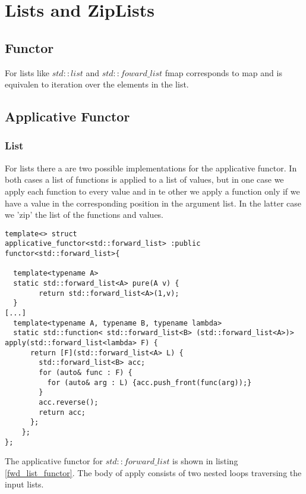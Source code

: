 \documentclass[12pt,fleqn]{article}
\begin{document}
\section{Lists and ZipLists}
%
%
\subsection{Functor}

For lists like $std::list$ and $std::foward\_list$ fmap corresponds to map and is equivalen to iteration over the elements in the list.

  
%
%
\subsection{Applicative Functor}
%
%

\subsubsection{List}
%
For lists there a are two possible implementations for the applicative functor.
In both cases a list of functions is applied to a list of values, but in one case we apply each function to every value and in te other we apply a function 
only if we have a value in the corresponding position in the argument list. 
In the latter case we 'zip' the list of the functions and values.
\begin{lstlisting}[caption=std::forward\_list is an applicative functor, label=fwd_list_functor]
template<> struct 
applicative_functor<std::forward_list> :public functor<std::forward_list>{

  template<typename A>
  static std::forward_list<A> pure(A v) {
		return std::forward_list<A>(1,v);
  }
[...]
  template<typename A, typename B, typename lambda>
  static std::function< std::forward_list<B> (std::forward_list<A>)> apply(std::forward_list<lambda> F) {
      return [F](std::forward_list<A> L) {
	    std::forward_list<B> acc;
	    for (auto& func : F) {
	      for (auto& arg : L) {acc.push_front(func(arg));}
        } 
	    acc.reverse();
	    return acc;
      };
    };
};
\end{lstlisting}
The applicative functor for $std::forward\_list$ is shown in listing \ref{fwd_list_functor}.
The body of apply consists of two nested loops traversing the input lists. 
%
\end{document}
